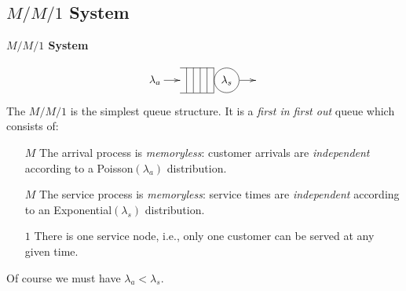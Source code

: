 \documentclass[compress]{beamer}        %
\makeatletter
\newcommand{\tcb}{\textcolor{beamer@blendedblue}}
\makeatother
\begin{document}
\subsection{$M / M / 1$ System}
\begin{frame}{\bf \tcb{$M / M / 1$ System\\[-1.5cm]}}

\begin{align*}
\xymatrixcolsep{0.5cm}
\xymatrix{\lambda_a \ar@{->}[r] & \hspace{-0.1cm}
{\begin{tabular}{@{}c|@{}c|@{}c|@{}c|@{}c|@{}c}
\cline{1-5}
&&&& &
\begin{tikzpicture}[baseline=(char.base)]
\node(char)[draw,shape=circle]{$\lambda_s$};
\end{tikzpicture}\\
\cline{1-5}
\end{tabular}} \hspace{-0.3cm}\ar@{->}[r] & %
}
\end{align*}
The {\boldmath$M / M / 1$} is the simplest queue structure. It is a \emph{first in first out} queue which consists of:\\[0.1cm]
\begin{enumerate}\itemsep0.5cm
\item[{\boldmath$M$}] The arrival process is \emph{memoryless}: customer arrivals are \emph{independent} according to a Poisson$(\lambda_a)$ distribution.
\item[{\boldmath$M$}] The service process is \emph{memoryless}: service times are \emph{independent} according to an Exponential$(\lambda_s)$ distribution.
\item[{\boldmath$1$}] There is one service node, i.e., only one customer can be served at any given time.\\[0.6cm]
\end{enumerate}

Of course we must have $\lambda_a < \lambda_s$.

\end{frame}
\end{document}
